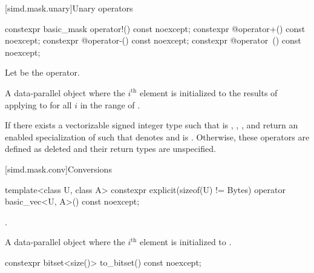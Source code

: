 [simd.mask.unary]{Unary operators}

\begin{itemdecl}
constexpr basic_mask operator!() const noexcept;
constexpr @\seebelow@ operator+() const noexcept;
constexpr @\seebelow@ operator-() const noexcept;
constexpr @\seebelow@ operator~() const noexcept;
\end{itemdecl}

\begin{itemdescr}
\pnum
Let  be the operator.

\pnum
\returns
A data-parallel object where the $i^\text{th}$ element is initialized to the
results of applying  to  for all $i$ in
the range of .

\pnum
\remarks
If there exists a vectorizable signed integer type  such that
 is ,
, , and 
return an enabled specialization  of  such that
 denotes  and
 is .
Otherwise,
these operators are defined as deleted and their return types are unspecified.
\end{itemdescr}

[simd.mask.conv]{Conversions}

\begin{itemdecl}
template<class U, class A>
  constexpr explicit(sizeof(U) != Bytes) operator basic_vec<U, A>() const noexcept;
\end{itemdecl}

\begin{itemdescr}
\pnum
\constraints
{}.

\pnum
\returns
A data-parallel object where the $i^\text{th}$ element is initialized to
.
\end{itemdescr}

\begin{itemdecl}
constexpr bitset<size()> to_bitset() const noexcept;
\end{itemdecl}

